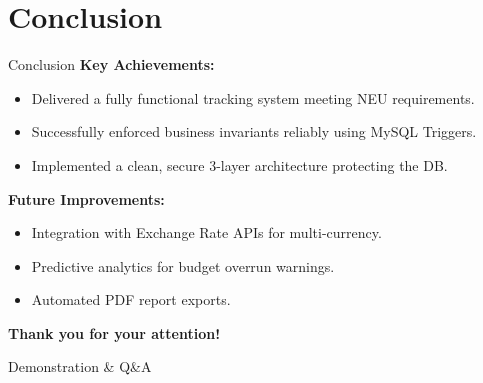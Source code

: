 \documentclass[aspectratio=169]{beamer}
\begin{document}
\section{Conclusion}
\begin{frame}{Conclusion}
    \textbf{Key Achievements:}
    \begin{itemize}
        \item Delivered a fully functional tracking system meeting NEU requirements.
        \item Successfully enforced business invariants reliably using MySQL Triggers.
        \item Implemented a clean, secure 3-layer architecture protecting the DB.
    \end{itemize}
    \vspace{0.4cm}
    \textbf{Future Improvements:}
    \begin{itemize}
        \item Integration with Exchange Rate APIs for multi-currency.
        \item Predictive analytics for budget overrun warnings.
        \item Automated PDF report exports.
    \end{itemize}
\end{frame}

\begin{frame}
    \begin{center}
        \Huge \textbf{Thank you for your attention!}
        
        \vspace{0.5cm}
        \large Demonstration \& Q\&A
    \end{center}
\end{frame}
\end{document}

